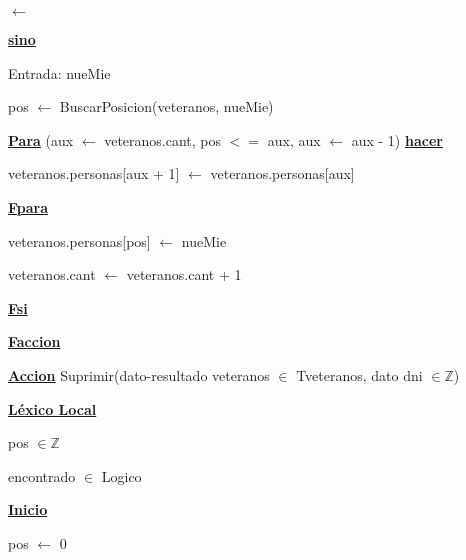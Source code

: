 \documentclass{article}
\begin{document}
                \hspace{16mm}$\leftarrow$

            \hspace{12mm}\underline{\textbf{sino}}

                \hspace{16mm}Entrada: nueMie

                \hspace{16mm} pos $\leftarrow$ BuscarPosicion(veteranos, nueMie)

                \hspace{16mm}\underline{\textbf{Para}} (aux $\leftarrow$ veteranos.cant, pos $<=$ aux, aux $\leftarrow$ aux - 1) 
                \underline{\textbf{hacer}}

                    \hspace{20mm}veteranos.personas[aux + 1] $\leftarrow$ veteranos.personas[aux]

                \hspace{16mm}\underline{\textbf{Fpara}}

                \hspace{16mm}veteranos.personas[pos] $\leftarrow$ nueMie

                \hspace{16mm}veteranos.cant $\leftarrow$ veteranos.cant + 1

            \hspace{12mm}\underline{\textbf{Fsi}}

    \hspace{4mm}\underline{\textbf{Faccion}}

    \vspace{4mm}

    \hspace{4mm}\underline{\textbf{Accion}} Suprimir(dato-resultado veteranos $\in$ Tveteranos, dato dni $\in \mathbb{Z}$)

        \hspace{8mm}\underline{\textbf{Léxico Local}}

            \hspace{12mm}pos $\in \mathbb{Z}$

            \hspace{12mm}encontrado $\in$ Logico

        \hspace{8mm}\underline{\textbf{Inicio}}

            \hspace{12mm} pos $\leftarrow$ 0
\end{document}
